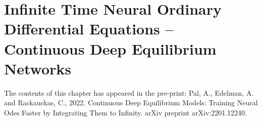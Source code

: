 \chapter{Infinite Time Neural Ordinary Differential Equations -- Continuous Deep Equilibrium Networks}
\label{chapter:infinite_time_neural_odes}

The contents of this chapter has appeared in the pre-print: Pal, A., Edelman, A. and Rackauckas, C., 2022. Continuous Deep Equilibrium Models: Training Neural Odes Faster by Integrating Them to Infinity. arXiv preprint arXiv:2201.12240.~\citep{pal2022mixing}